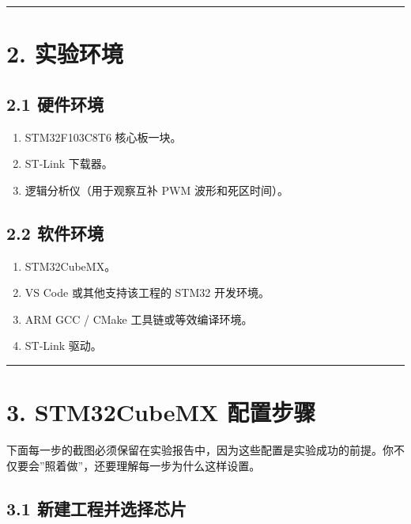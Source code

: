 \documentclass[
  chinese,
  UTF8,
  oneside,
  openany]{ctexbook}
\providecommand{\tightlist}{%
  \setlength{\itemsep}{0pt}\setlength{\parskip}{0pt}}
\begin{document}
\begin{center}\rule{0.5\linewidth}{0.5pt}\end{center}

\section{2. 实验环境}\label{ux5b9eux9a8cux73afux5883-5}

\subsection{2.1 硬件环境}\label{ux786cux4ef6ux73afux5883-5}

\begin{enumerate}
\def\labelenumi{\arabic{enumi}.}
\tightlist
\item
  STM32F103C8T6 核心板一块。
\item
  ST-Link 下载器。
\item
  逻辑分析仪（用于观察互补 PWM 波形和死区时间）。
\end{enumerate}

\subsection{2.2 软件环境}\label{ux8f6fux4ef6ux73afux5883-5}

\begin{enumerate}
\def\labelenumi{\arabic{enumi}.}
\tightlist
\item
  STM32CubeMX。
\item
  VS Code 或其他支持该工程的 STM32 开发环境。
\item
  ARM GCC / CMake 工具链或等效编译环境。
\item
  ST-Link 驱动。
\end{enumerate}

\begin{center}\rule{0.5\linewidth}{0.5pt}\end{center}

\section{3. STM32CubeMX
配置步骤}\label{stm32cubemx-ux914dux7f6eux6b65ux9aa4-10}

下面每一步的截图必须保留在实验报告中，因为这些配置是实验成功的前提。你不仅要会''照着做''，还要理解每一步为什么这样设置。

\subsection{3.1
新建工程并选择芯片}\label{ux65b0ux5efaux5de5ux7a0bux5e76ux9009ux62e9ux82afux7247-4}
\end{document}
